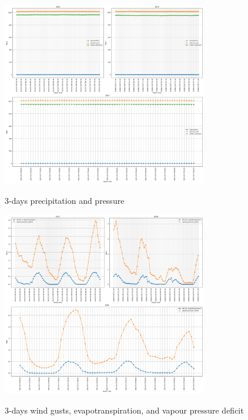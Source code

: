 \begin{figure}[h]
	\centering
	\caption{3-days precipitation and pressure }
	\includegraphics[width=0.8\textwidth]{graphs/weather_variables/3_precipitation_pressure_msl_surface_pressure.png}
	\label{fig:precipitation_pressure_3days}
\end{figure}

\begin{figure}[h]
	\centering
	\caption{3-days wind gusts, evapotranspiration, and vapour pressure deficit }
	\includegraphics[width=0.8\textwidth]{graphs/weather_variables/3_et0_fao_evapotranspiration_vapour_pressure_deficit_wind_gusts_10m.png}
	\label{fig:evapotranspiration_3days}
\end{figure}

